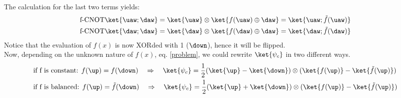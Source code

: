 The calculation for the last two terms yields:
\begin{equation}
  \begin{split}
    \text{f-CNOT}\ket{\uaw;\daw} &=
    \ket{\uaw}\otimes\ket{f(\uaw)\oplus \daw} = \ket{\uaw;\tilde{f}(\uaw)}\\
    \text{f-CNOT}\ket{\daw;\daw} &=
    \ket{\daw}\otimes\ket{f(\daw)\oplus \daw} = \ket{\daw;\tilde{f}(\daw)}
  \end{split}
\end{equation}
Notice that the evaluation of $f(x)$ is now XORded with 1 ($\down$), hence it will be flipped.\\

Now, depending on the unknown nature of $f(x)$, eq. \eqref{problem}, we could rewrite $\ket{\psi_c}$ in two different ways.
\begin{equation}
  \begin{split}
    &\text{if f is constant:   }f(\up)=f(\down)\quad\Rightarrow\quad
    \ket{\psi_c}=
    \frac{1}{2}(\ket{\up}-\ket{\down})\otimes
    (\ket{f(\up)}-\ket{\tilde{f}(\up)})\\
    &\text{if f is balanced:   } f(\up)=\tilde{f}(\down)\quad\Rightarrow\quad
    \ket{\psi_c}=
    \frac{1}{2}(\ket{\up}+\ket{\down})\otimes
    (\ket{f(\up)}-\ket{\tilde{f}(\up)}) \\
  \end{split}
\end{equation}


